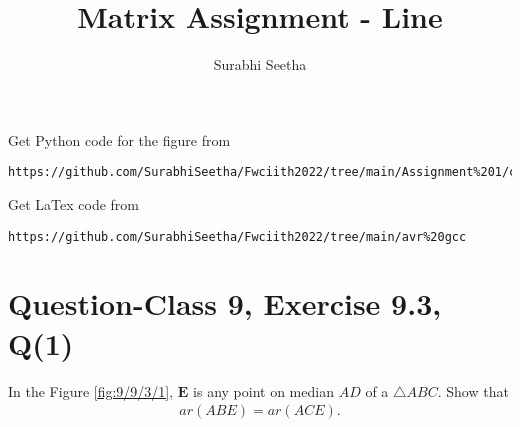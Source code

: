 \documentclass[journal,12pt,twocolumn]{IEEEtran}
\begin{document}
\makeatother
\let\StandardTheFigure\thefigure
\let\vec\mathbf
\renewcommand{\thefigure}{\theproblem}
\def\putbox#1#2#3{\makebox[0in][l]{\makebox[#1][l]{}\raisebox{\baselineskip}[0in][0in]{\raisebox{#2}[0in][0in]{#3}}}}
     \def\rightbox#1{\makebox[0in][r]{#1}}
     \def\centbox#1{\makebox[0in]{#1}}
     \def\topbox#1{\raisebox{-\baselineskip}[0in][0in]{#1}}
     \def\midbox#1{\raisebox{-0.5\baselineskip}[0in][0in]{#1}}
\vspace{3cm}
\title{\textbf{Matrix Assignment - Line} }
\author{Surabhi Seetha}
\maketitle
\newpage
\bigskip
\renewcommand{\thefigure}{\theenumi}
\renewcommand{\thetable}{\theenumi}
Get Python code for the figure from 
\begin{lstlisting}
https://github.com/SurabhiSeetha/Fwciith2022/tree/main/Assignment%201/codes/src
\end{lstlisting}
Get LaTex code from
\begin{lstlisting}
https://github.com/SurabhiSeetha/Fwciith2022/tree/main/avr%20gcc
\end{lstlisting}
%
\section{Question-Class 9, Exercise 9.3, Q(1)}
\fi
In the Figure 
		\ref{fig:9/9/3/1},
$\vec{E}$ is any point on median $AD$ of a $\triangle ABC$. Show that 
\begin{align}
ar(ABE) = ar(ACE). 
		\label{eq:9/9/3/1}
\end{align}
\end{document}
